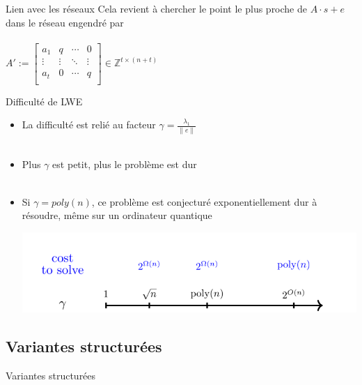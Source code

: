 \documentclass[10 pt, a4paper]{beamer}
\begin{document}
\begin{frame}{Lien avec les réseaux}
Cela revient à chercher le point le plus proche de $A\cdot s + e$ dans le réseau engendré par \\ ~ \\ $A' := 
 \left[\begin{array}{c|ccc}
a_1 &q&\cdots & 0\\
\vdots & \vdots &\ddots & \vdots\\
a_t & 0 & \cdots &q\\
\end{array}\right]
\in \mathbb{Z}^{t\times (n+t)}$
\end{frame}


\begin{frame}{Difficulté de LWE}
\begin{itemize}
\item<1->[•]La difficulté est relié au facteur $\gamma = \frac{\lambda_1}{\|e\|}$ \\ ~ \\
\item<2->[•] Plus $\gamma$ est petit, plus le problème est dur \\ ~ \\
\item<3->[•] Si $\gamma = poly(n)$, ce problème est conjecturé exponentiellement dur à résoudre, même sur un ordinateur quantique
\begin{center}
\includegraphics[scale=0.30]{gamma_hard.png}
\end{center}
\end{itemize}
\end{frame}

\subsection{Variantes structurées}
\begin{frame}{Variantes structurées}
\end{frame}
\end{document}
